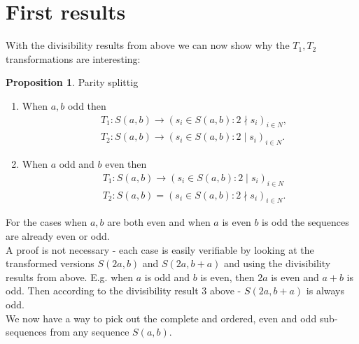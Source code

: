 \documentclass{article}
\theoremstyle{definition}
\newtheorem{proposition}{Proposition}[section]
\begin{document}
\section{First results}
With the divisibility results from above we can now show why the $T_1, T_2$ transformations are interesting:
\begin{proposition}\label{proposition:prop1}
Parity splittig
\begin{enumerate}
    \item When $a,b$ odd then
    \begin{equation*}
    \begin{split}
        & T_1: S(a,b) \longrightarrow (s_i \in S(a,b): 2 \nmid s_i)_{i\in N}, \\
        & T_2: S(a,b) \longrightarrow (s_i \in S(a,b): 2 \mid s_i)_{i\in N}.
    \end{split}
    \end{equation*}
    \item When $a$ odd and $b$ even then
    \begin{equation*}
    \begin{split}
        & T_1: S(a,b) \longrightarrow (s_i \in S(a,b): 2 \mid s_i)_{i\in N} \\
        & T_2: S(a,b) = (s_i \in S(a,b): 2 \nmid s_i)_{i\in N}.
    \end{split}
    \end{equation*}
\end{enumerate}
\end{proposition}
%
\noindent
For the cases when $a,b$ are both even and when $a$ is even $b$ is odd the sequences are already even or odd.
%
\\[.4cm]
%
A proof is not necessary - each case is easily verifiable by looking at the transformed versions $S(2a,b)$ and $S(2a,b+a)$ and using the divisibility results from above. E.g. when $a$ is odd and $b$ is even, then $2a$ is even and $a+b$ is odd. Then according to the divisibility result 3 above - $S(2a,b+a)$ is always odd.
%
\\[.4cm]
%
We now have a way to pick out the complete and ordered, even and odd sub-sequences from any sequence $S(a,b)$.
\end{document}
